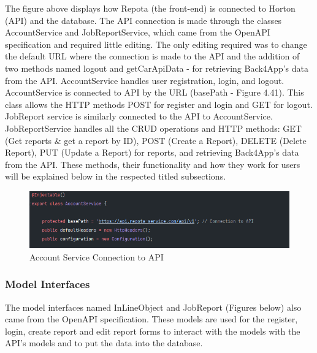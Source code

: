 The figure above displays how Repota (the front-end) is connected to Horton (API) and the database. The API connection is made through the classes AccountService and JobReportService, which came from the OpenAPI specification and required little editing. The only editing required was to change the default URL where the connection is made to the API and the addition of two methods named logout and getCarApiData - for retrieving Back4App's data from the API. AccountService handles user registration, login, and logout. AccountService is connected to API by the URL (basePath - Figure 4.41). This class allows the HTTP methods POST for register and login and GET for logout. JobReport service is similarly connected to the API to AccountService. JobReportService handles all the CRUD operations and HTTP methods: GET (Get reports \& get a report by ID), POST (Create a Report), DELETE (Delete Report), PUT (Update a Report) for reports, and retrieving Back4App's data from the API. These methods, their functionality and how they work for users will be explained below in the respected titled subsections.

\begin{figure}[H]
    \caption{Account Service Connection to API}
    \label{image:a-s-conn}
    \centering
    \includegraphics[width=1.0\textwidth]{images/repota_and_horton/account_service.png}
\end{figure}

\subsubsection{Model Interfaces}
The model interfaces named InLineObject and JobReport (Figures below) also came from the OpenAPI specification. These models are used for the register, login, create report and edit report forms to interact with the models with the API's models and to put the data into the database. 

